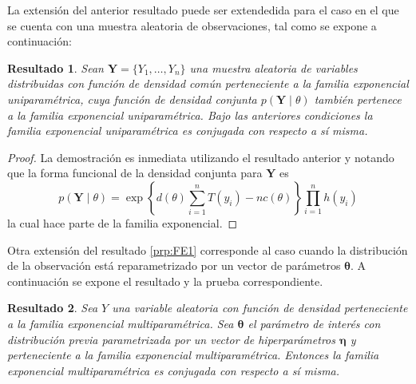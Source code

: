 \documentclass[
  10pt,
  spanish,
]{book}
\newtheorem{proposition}{Resultado}[chapter]
\theoremstyle{definition}
\theoremstyle{definition}
\theoremstyle{definition}
\theoremstyle{definition}
\theoremstyle{remark}
\begin{document}
La extensión del anterior resultado puede ser extendedida para el caso en el que se cuenta con una muestra aleatoria de observaciones, tal como se expone a
continuación:

\begin{proposition}
\protect\hypertarget{prp:unnamed-chunk-3}{}{\label{prp:unnamed-chunk-3} }Sean \(\mathbf{Y}=\{Y_1, \ldots, Y_n\}\) una muestra aleatoria de variables distribuidas con función de densidad común perteneciente a la familia exponencial uniparamétrica, cuya función de densidad conjunta \(p(\mathbf{Y} \mid \theta)\) también pertenece a la familia exponencial uniparamétrica. Bajo las anteriores condiciones la familia exponencial uniparamétrica es conjugada con respecto a sí misma.
\end{proposition}

\begin{proof}
{}La demostración es inmediata utilizando el resultado anterior y notando que la forma funcional de la densidad conjunta para \(\mathbf{Y}\) es
\begin{equation}
p(\mathbf{Y} \mid \theta)=\exp\left\{d(\theta)\sum_{i=1}^nT(y_i)-nc(\theta)\right\}\prod_{i=1}^nh(y_i)
\end{equation}
la cual hace parte de la familia exponencial.
\end{proof}

Otra extensión del resultado \ref{prp:FE1} corresponde al caso cuando la
distribución de la observación está reparametrizado por un vector de
parámetros \(\boldsymbol \theta\). A continuación se expone el resultado y la prueba
correspondiente.

\begin{proposition}
\protect\hypertarget{prp:unnamed-chunk-5}{}{\label{prp:unnamed-chunk-5} }Sea \(Y\) una variable aleatoria con función de densidad perteneciente a la familia exponencial multiparamétrica. Sea \(\boldsymbol \theta\) el parámetro de interés con distribución previa parametrizada por un vector de hiperparámetros \(\boldsymbol \eta\) y perteneciente a la familia exponencial multiparamétrica. Entonces la familia exponencial multiparamétrica es conjugada con respecto a sí misma.
\end{proposition}
\end{document}
